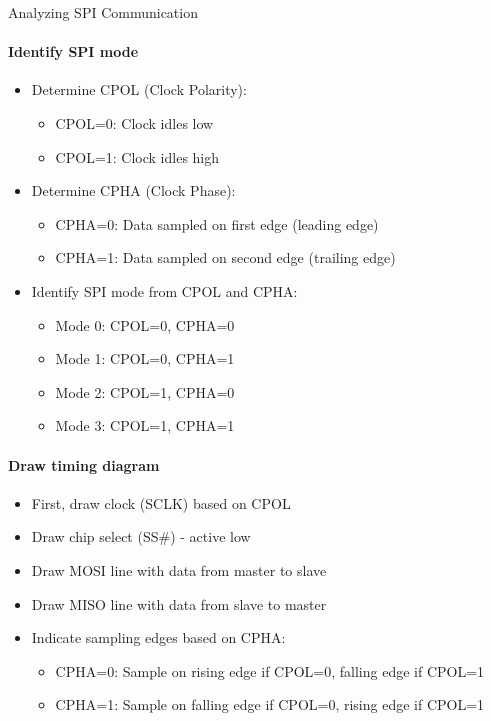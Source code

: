 \begin{KR}{Analyzing SPI Communication}\\
\paragraph{Identify SPI mode}
\begin{itemize}
    \item Determine CPOL (Clock Polarity):
    \begin{itemize}
        \item CPOL=0: Clock idles low
        \item CPOL=1: Clock idles high
    \end{itemize}
    \item Determine CPHA (Clock Phase):
    \begin{itemize}
        \item CPHA=0: Data sampled on first edge (leading edge)
        \item CPHA=1: Data sampled on second edge (trailing edge)
    \end{itemize}
    \item Identify SPI mode from CPOL and CPHA:
    \begin{itemize}
        \item Mode 0: CPOL=0, CPHA=0
        \item Mode 1: CPOL=0, CPHA=1
        \item Mode 2: CPOL=1, CPHA=0
        \item Mode 3: CPOL=1, CPHA=1
    \end{itemize}
\end{itemize}

\paragraph{Draw timing diagram}
\begin{itemize}
    \item First, draw clock (SCLK) based on CPOL
    \item Draw chip select (SS\#) - active low
    \item Draw MOSI line with data from master to slave
    \item Draw MISO line with data from slave to master
    \item Indicate sampling edges based on CPHA:
    \begin{itemize}
        \item CPHA=0: Sample on rising edge if CPOL=0, falling edge if CPOL=1
        \item CPHA=1: Sample on falling edge if CPOL=0, rising edge if CPOL=1
    \end{itemize}
\end{itemize}


\end{KR}
